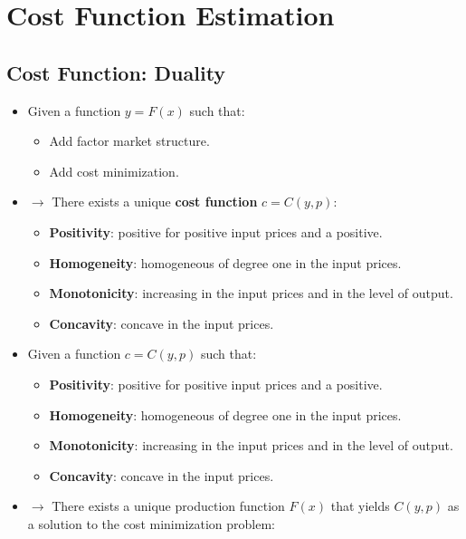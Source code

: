 \documentclass[]{book}
\providecommand{\tightlist}{%
  \setlength{\itemsep}{0pt}\setlength{\parskip}{0pt}}
\theoremstyle{definition}
\theoremstyle{definition}
\theoremstyle{definition}
\theoremstyle{remark}
\begin{document}
\section{Cost Function Estimation}\label{cost-function-estimation}

\subsection{Cost Function: Duality}\label{cost-function-duality}

\begin{itemize}
\item
  Given a function \(y = F(x)\) such that:

  \begin{itemize}
  \tightlist
  \item
    Add factor market structure.
  \item
    Add cost minimization.
  \end{itemize}
\item
  \(\rightarrow\) There exists a unique \textbf{cost function}
  \(c = C(y, p)\):

  \begin{itemize}
  \tightlist
  \item
    \textbf{Positivity}: positive for positive input prices and a
    positive.
  \item
    \textbf{Homogeneity}: homogeneous of degree one in the input prices.
  \item
    \textbf{Monotonicity}: increasing in the input prices and in the
    level of output.
  \item
    \textbf{Concavity}: concave in the input prices.
  \end{itemize}
\item
  Given a function \(c = C(y, p)\) such that:

  \begin{itemize}
  \tightlist
  \item
    \textbf{Positivity}: positive for positive input prices and a
    positive.
  \item
    \textbf{Homogeneity}: homogeneous of degree one in the input prices.
  \item
    \textbf{Monotonicity}: increasing in the input prices and in the
    level of output.
  \item
    \textbf{Concavity}: concave in the input prices.
  \end{itemize}
\item
  \(\rightarrow\) There exists a unique production function \(F(x)\)
  that yields \(C(y, p)\) as a solution to the cost minimization
  problem:


\end{itemize}
\end{document}

